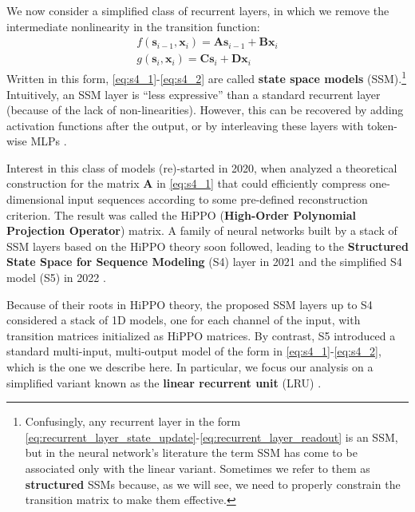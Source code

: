 We now consider a simplified class of recurrent layers, in which we remove the intermediate nonlinearity in the transition function:
%
\begin{align}
f(\mathbf{s}_{i-1},\mathbf{x}_i)= \mathbf{A}\mathbf{s}_{i-1}+\mathbf{B}\mathbf{x}_i \label{eq:s4_1} \\
g(\mathbf{s}_i,\mathbf{x}_i)=\mathbf{C}\mathbf{s}_i+\mathbf{D}\mathbf{x}_i \label{eq:s4_2}
\end{align}
%
Written in this form, \eqref{eq:s4_1}-\eqref{eq:s4_2} are called \textbf{state space models} (SSM).\footnote{Confusingly, any recurrent layer in the form \eqref{eq:recurrent_layer_state_update}-\eqref{eq:recurrent_layer_readout} is an SSM, but in the neural network's literature the term SSM has come to be associated only with the linear variant. Sometimes we refer to them as \textbf{structured} SSMs because, as we will see, we need to properly constrain the transition matrix to make them effective.}  Intuitively, an SSM layer is “less expressive” than a standard recurrent layer (because of the lack of non-linearities). However, this can be recovered by adding activation functions after the output, or by interleaving these layers with token-wise MLPs \cite{orvieto2023universality}.

Interest in this class of models (re)-started in 2020, when \cite{gu2020hippo} analyzed a theoretical construction for the matrix $\mathbf{A}$ in \eqref{eq:s4_1} that could efficiently compress one-dimensional input sequences according to some pre-defined reconstruction criterion. The result was called the HiPPO (\textbf{High-Order Polynomial Projection Operator}) matrix. A family of neural networks built by a stack of SSM layers based on the HiPPO theory soon followed, leading to the \textbf{Structured State Space for Sequence Modeling} (S4) layer in 2021 \cite{gu2021efficiently} and the simplified S4 model (S5) in 2022 \cite{smith2022simplified}. 

Because of their roots in HiPPO theory, the proposed SSM layers up to S4 considered a stack of 1D models, one for each channel of the input, with transition matrices initialized as HiPPO matrices. By contrast, S5 introduced a standard multi-input, multi-output model of the form in \eqref{eq:s4_1}-\eqref{eq:s4_2}, which is the one we describe here. In particular, we focus our analysis on a simplified variant known as the \textbf{linear recurrent unit} (LRU) \cite{orvieto2023resurrecting}.


